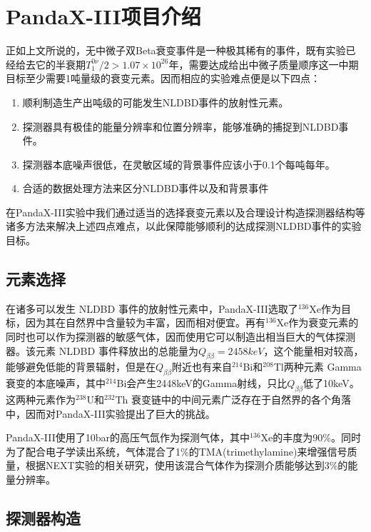 
\chapter{PandaX-III项目介绍}
\label{chapter:intro}

正如上文所说的，无中微子双Beta衰变事件是一种极其稀有的事件，既有实验已经给去它的半衰期$T^{0\nu}_1/2>1.07\times10^{26}$年，需要达成给出中微子质量顺序这一中期目标至少需要1吨量级的衰变元素。因而相应的实验难点便是以下四点：
\begin{enumerate}
    \item 顺利制造生产出吨级的可能发生NLDBD事件的放射性元素。
    \item 探测器具有极佳的能量分辨率和位置分辨率，能够准确的捕捉到NLDBD事件。
    \item 探测器本底噪声很低，在灵敏区域的背景事件应该小于0.1个每吨每年。
    \item 合适的数据处理方法来区分NLDBD事件以及和背景事件
\end{enumerate}
在PandaX-III实验中我们通过适当的选择衰变元素以及合理设计构造探测器结构等诸多方法来解决上述四点难点，以此保障能够顺利的达成探测NLDBD事件的实验目标。

\section{元素选择}

在诸多可以发生 NLDBD 事件的放射性元素中，PandaX-III选取了$^{136}$Xe作为目标，因为其在自然界中含量较为丰富，因而相对便宜。再有$^{136}$Xe作为衰变元素的同时也可以作为探测器的敏感气体，因而使用它可以制造出相当巨大的气体探测器。该元素 NLDBD 事件释放出的总能量为$Q_{\beta\beta}=2458keV$，这个能量相对较高，能够避免低能的背景辐射，但是在$Q_{\beta\beta}$附近也有来自$^{214}$Bi和$^{208}$Tl两种元素 Gamma 衰变的本底噪声，其中$^{214}$Bi会产生2448keV的Gamma射线，只比$Q_{\beta\beta}$低了10keV。这两种元素作为$^{238}$U和$^{232}$Th
衰变链中的中间元素广泛存在于自然界的各个角落中，因而对PandaX-III实验提出了巨大的挑战。

PandaX-III使用了10bar的高压气氙作为探测气体，其中$^{136}$Xe的丰度为90\%。同时为了配合电子学读出系统，气体混合了1\%的TMA(trimethylamine)来增强信号质量，根据NEXT实验的相关研究，使用该混合气体作为探测介质能够达到3\%的能量分辨率\supercite{azevedoh2015accurate}。

\section{探测器构造}

